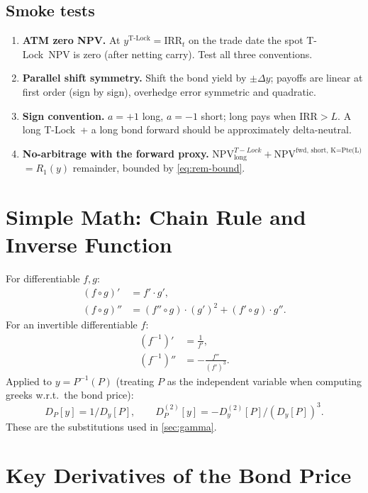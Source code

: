 \documentclass[11pt]{article}
\theoremstyle{definition}
\newcommand{\Tlock}{T-Lock}
\newcommand{\IRR}{\ensuremath{\mathrm{IRR}}}
\newcommand{\ytl}{y^{\text{T-Lock}}}
\newcommand{\dDy}[1]{D_{y}^{(#1)}}              %
\newcommand{\dDP}[1]{D_{P}^{(#1)}}              %
\begin{document}
\subsection{Smoke tests}

\begin{enumerate}[leftmargin=1.6em,itemsep=2pt]
\item \textbf{ATM zero NPV.}
      At $\ytl = \IRR_t$ on the trade date the spot \Tlock\ NPV is zero
      (after netting carry). Test all three conventions.
\item \textbf{Parallel shift symmetry.}
      Shift the bond yield by $\pm\Delta y$; payoffs are linear at first
      order (sign by sign), overhedge error symmetric and quadratic.
\item \textbf{Sign convention.} $a=+1$ long, $a=-1$ short; long pays
      when $\IRR > L$. A long \Tlock\ + a long bond forward should be
      approximately delta-neutral.
\item \textbf{No-arbitrage with the forward proxy.}
      $\text{NPV}^{\Tlock}_{\text{long}} +
       \text{NPV}^{\text{fwd, short, K=Pte(L)}}$
      $= R_1(y)$ remainder, bounded by \cref{eq:rem-bound}.
\end{enumerate}


\appendix

\section{Simple Math: Chain Rule and Inverse Function}\label{sec:simple-math}

For differentiable $f,g$:
\begin{align}
(f\circ g)'  &= f' \cdot g', \label{eq:chain1}\\
(f\circ g)'' &= (f''\circ g)\cdot(g')^2 + (f'\circ g)\cdot g''.
\label{eq:chain2}
\end{align}
For an invertible differentiable $f$:
\begin{align}
(f^{-1})' &= \frac{1}{f'}, \label{eq:inv1}\\
(f^{-1})'' &= -\frac{f''}{(f')^3}. \label{eq:inv2}
\end{align}
Applied to $y = P^{-1}(P)$ (treating $P$ as the independent variable
when computing greeks w.r.t.\ the bond price):
\[
D_P[y] = 1/D_y[P], \qquad
\dDP{2}[y] = -\dDy{2}[P]/(D_y[P])^3.
\]
These are the substitutions used in \cref{sec:gamma}.


\section{Key Derivatives of the Bond Price}\label{sec:key-derivs}
\end{document}
